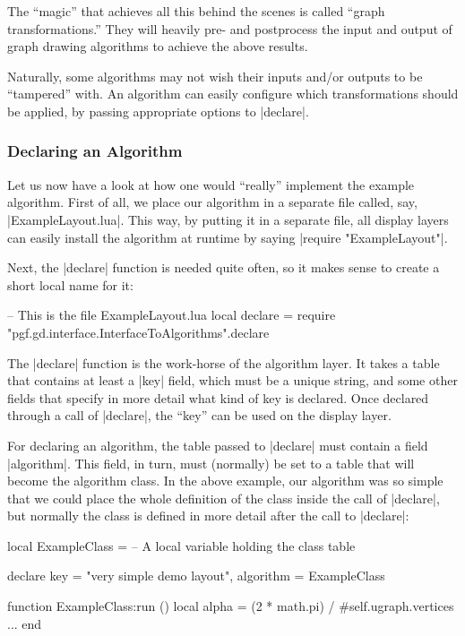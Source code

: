 The ``magic'' that achieves all this behind the scenes is called 
``graph transformations.'' They will heavily pre- and postprocess the
input and output of graph drawing algorithms to achieve the above
results. 

Naturally, some algorithms may not wish their inputs and/or
outputs to be ``tampered'' with. An algorithm can easily configure
which transformations should be applied, by passing appropriate options
to |declare|.


\subsubsection{Declaring an Algorithm}

Let us now have a look at how one would ``really'' implement the
example algorithm. First of all, we place our algorithm in a
separate file called, say, |ExampleLayout.lua|. This way, by putting
it in a separate file, all display layers can easily install the
algorithm at runtime by saying |require "ExampleLayout"|.

Next, the |declare| function is needed quite often, so it makes sense
to create a short local name for it:

\begin{codeexample}
-- This is the file ExampleLayout.lua
local declare = require "pgf.gd.interface.InterfaceToAlgorithms".declare  
\end{codeexample}

The |declare| function is the work-horse of the algorithm layer. It
takes a table that contains at least a |key| field, which must be a
unique string, and some other fields that specify in more detail what
kind of key is declared. Once declared through a call of |declare|,
the ``key'' can be used on the display layer.

For declaring an algorithm, the table passed to |declare| must contain
a field |algorithm|. This field, in turn, must (normally) be set to a
table that will become the algorithm class. In the above example, our
algorithm was so simple that we could place the whole definition of
the class inside the call of |declare|, but normally the class is
defined in more detail after the call to |declare|:

\begin{codeexample}
local ExampleClass = {}  -- A local variable holding the class table

declare {
  key = "very simple demo layout",
  algorithm = ExampleClass
}

function ExampleClass:run ()
  local alpha = (2 * math.pi) / #self.ugraph.vertices
  ...
end
\end{codeexample}

